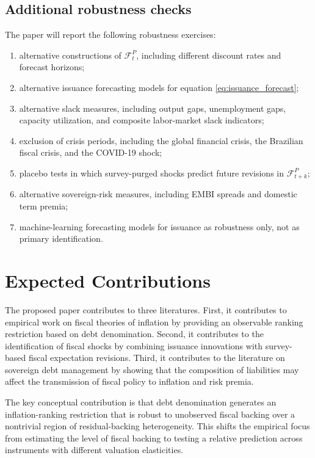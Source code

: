 \documentclass[12pt,a4paper]{article}
\begin{document}
\subsection{Additional robustness checks}

The paper will report the following robustness exercises:
\begin{enumerate}[leftmargin=1.2cm]
    \item alternative constructions of \(\mathcal{F}_t^P\), including different discount rates and forecast horizons;
    \item alternative issuance forecasting models for equation \eqref{eq:issuance_forecast};
    \item alternative slack measures, including output gaps, unemployment gaps, capacity utilization, and composite labor-market slack indicators;
    \item exclusion of crisis periods, including the global financial crisis, the Brazilian fiscal crisis, and the COVID-19 shock;
    \item placebo tests in which survey-purged shocks predict future revisions in \(\mathcal{F}_{t+k}^{P}\);
    \item alternative sovereign-risk measures, including EMBI spreads and domestic term premia;
    \item machine-learning forecasting models for issuance as robustness only, not as primary identification.
\end{enumerate}

\section{Expected Contributions}

The proposed paper contributes to three literatures. First, it contributes to empirical work on fiscal theories of inflation by providing an observable ranking restriction based on debt denomination. Second, it contributes to the identification of fiscal shocks by combining issuance innovations with survey-based fiscal expectation revisions. Third, it contributes to the literature on sovereign debt management by showing that the composition of liabilities may affect the transmission of fiscal policy to inflation and risk premia.

The key conceptual contribution is that debt denomination generates an inflation-ranking restriction that is robust to unobserved fiscal backing over a nontrivial region of residual-backing heterogeneity. This shifts the empirical focus from estimating the level of fiscal backing to testing a relative prediction across instruments with different valuation elasticities.
\end{document}
